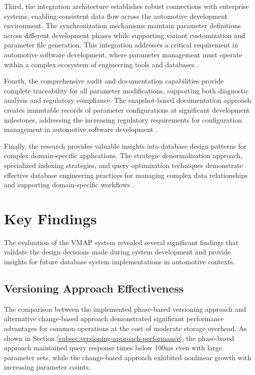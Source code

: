 Third, the integration architecture establishes robust connections with enterprise systems, enabling consistent data flow across the automotive development environment. The synchronization mechanisms maintain parameter definitions across different development phases while supporting variant customization and parameter file generation. This integration addresses a critical requirement in automotive software development, where parameter management must operate within a complex ecosystem of engineering tools and databases \cite{hohpe2002enterprise}.

Fourth, the comprehensive audit and documentation capabilities provide complete traceability for all parameter modifications, supporting both diagnostic analysis and regulatory compliance. The snapshot-based documentation approach creates immutable records of parameter configurations at significant development milestones, addressing the increasing regulatory requirements for configuration management in automotive software development \cite{staron2021automotive}.

Finally, the research provides valuable insights into database design patterns for complex domain-specific applications. The strategic denormalization approach, specialized indexing strategies, and query optimization techniques demonstrate effective database engineering practices for managing complex data relationships and supporting domain-specific workflows \cite{obe2017postgresql}.

\section{Key Findings}
\label{sec:key-findings}

The evaluation of the VMAP system revealed several significant findings that validate the design decisions made during system development and provide insights for future database system implementations in automotive contexts.

\subsection{Versioning Approach Effectiveness}
\label{subsec:versioning-effectiveness}

The comparison between the implemented phase-based versioning approach and alternative change-based approach demonstrated significant performance advantages for common operations at the cost of moderate storage overhead. As shown in Section \ref{subsec:versioning-approach-performance}, the phase-based approach maintained query response times below 100ms even with large parameter sets, while the change-based approach exhibited nonlinear growth with increasing parameter counts.

